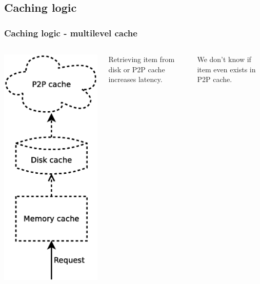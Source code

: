 \documentclass{beamer}
\begin{document}
\subsection{Caching logic}
\begin{frame}
\frametitle{Caching logic \cite{motwani1995randomized} - multilevel cache}
\begin{columns}[c]

\begin{center}
\includegraphics[width=0.65\linewidth]{cache1.eps}
\end{center}

\begin{block}{}
Retrieving item from disk or P2P cache increases latency.
\end{block}
\begin{block}{}
We don't know if item even exists in P2P cache.
\end{block}

\end{columns}
\end{frame}
\end{document}
